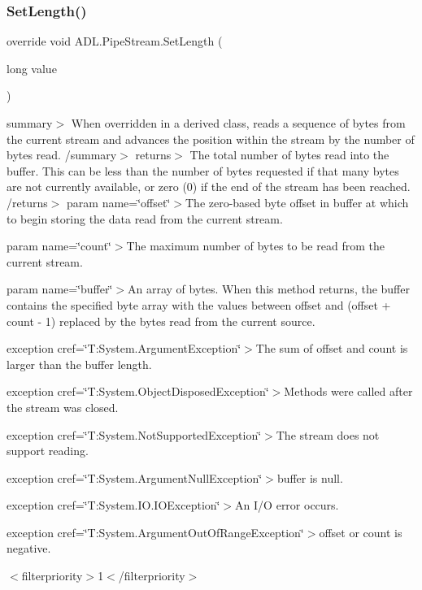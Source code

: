 \subsubsection{\texorpdfstring{Set\+Length()}{SetLength()}}
{\footnotesize\ttfamily override void A\+D\+L.\+Pipe\+Stream.\+Set\+Length (\begin{DoxyParamCaption}\item[{long}]{value }\end{DoxyParamCaption})}

summary$>$ When overridden in a derived class, reads a sequence of bytes from the current stream and advances the position within the stream by the number of bytes read. /summary$>$ returns$>$ The total number of bytes read into the buffer. This can be less than the number of bytes requested if that many bytes are not currently available, or zero (0) if the end of the stream has been reached. /returns$>$ param name=\char`\"{}offset\char`\"{}$>$The zero-\/based byte offset in buffer at which to begin storing the data read from the current stream. 

param name=\char`\"{}count\char`\"{}$>$The maximum number of bytes to be read from the current stream. 

param name=\char`\"{}buffer\char`\"{}$>$An array of bytes. When this method returns, the buffer contains the specified byte array with the values between offset and (offset + count -\/ 1) replaced by the bytes read from the current source. 

exception cref=\char`\"{}\+T\+:\+System.\+Argument\+Exception\char`\"{}$>$The sum of offset and count is larger than the buffer length. 

exception cref=\char`\"{}\+T\+:\+System.\+Object\+Disposed\+Exception\char`\"{}$>$Methods were called after the stream was closed. 

exception cref=\char`\"{}\+T\+:\+System.\+Not\+Supported\+Exception\char`\"{}$>$The stream does not support reading. 

exception cref=\char`\"{}\+T\+:\+System.\+Argument\+Null\+Exception\char`\"{}$>$buffer is null. 

exception cref=\char`\"{}\+T\+:\+System.\+I\+O.\+I\+O\+Exception\char`\"{}$>$An I/O error occurs. 

exception cref=\char`\"{}\+T\+:\+System.\+Argument\+Out\+Of\+Range\+Exception\char`\"{}$>$offset or count is negative. 

$<$filterpriority$>$1$<$/filterpriority$>$ \mbox{\label{class_a_d_l_1_1_pipe_stream_a5f8e6e0a0b7070fc2e5320d2007eadd1}} 
